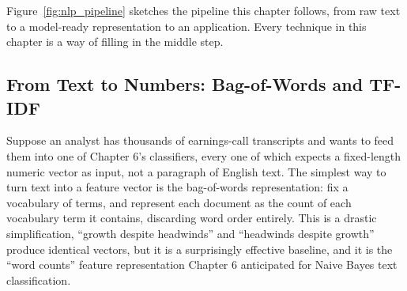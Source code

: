 \documentclass[../ai_in_finance]{subfiles}
\begin{document}
Figure~\ref{fig:nlp_pipeline} sketches the pipeline this chapter follows, from raw text to a model-ready representation to an application. Every technique in this chapter is a way of filling in the middle step.

\begin{figure}[htbp]
\centering
\begin{lrbox}{\bookmeasuredbox}
\end{lrbox}
\ifdim\wd\bookmeasuredbox<0.65\linewidth
\setlength{\bookcapwidth}{0.65\linewidth}
\else
\setlength{\bookcapwidth}{\wd\bookmeasuredbox}
\fi
{}
\end{figure}

\subsection{From Text to Numbers: Bag-of-Words and TF-IDF}
\label{sec:bow-tfidf}

Suppose an analyst has thousands of earnings-call transcripts and wants to feed them into one of Chapter 6's classifiers, every one of which expects a fixed-length numeric vector as input, not a paragraph of English text. The simplest way to turn text into a feature vector is the bag-of-words representation: fix a vocabulary of terms, and represent each document as the count of each vocabulary term it contains, discarding word order entirely. This is a drastic simplification, ``growth despite headwinds'' and ``headwinds despite growth'' produce identical vectors, but it is a surprisingly effective baseline, and it is the ``word counts'' feature representation Chapter 6 anticipated for Naive Bayes text classification.
\end{document}
